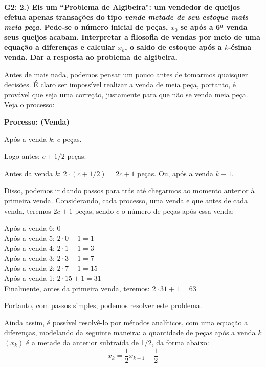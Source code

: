\documentclass[10pt]{article}
\begin{document}
\vspace{\baselineskip}


\textbf{G2: 2.) Eis um ``Problema de Algibeira": um vendedor de queijos efetua apenas transações do tipo \emph{vende metade de seu estoque mais meia peça}. Pede-se o número inicial de peças, $x_0$ se após a 6ª venda seus queijos acabam. Interpretar a filosofia de vendas por meio de uma equação a diferenças e calcular $x_k$, o saldo de estoque após a $k$-ésima venda. Dar a resposta ao problema de algibeira.}

Antes de mais nada, podemos pensar um pouco antes de tomarmos quaisquer decisões. É claro ser impossível realizar a venda de meia peça, portanto, é provável que seja uma correção, justamente para que não se venda meia peça. Veja o processo:

\textbf{Processo: (Venda)}

Após a venda $k$: $c$ peças.

Logo antes: $c + 1/2$ peças.

Antes da venda $k$: $2 \cdot (c + 1/2) = \boxed{2c + 1}$ peças. Ou, após a venda $k - 1$.

Disso, podemos ir dando passos para trás até chegarmos ao momento anterior à primeira venda. Considerando, cada processo, uma venda e que antes de cada venda, teremos $2c + 1$ peças, sendo $c$ o número de peças após essa venda:

Após a venda 6: 0\\
Após a venda 5: $2 \cdot 0 + 1 = 1$\\
Após a venda 4: $2 \cdot 1 + 1 = 3$\\
Após a venda 3: $2 \cdot 3 + 1 = 7$\\
Após a venda 2: $2 \cdot 7 + 1 = 15$\\
Após a venda 1: $2 \cdot 15 + 1 = 31$\\
Finalmente, antes da primeira venda, teremos: $2 \cdot 31 + 1 = 63$

Portanto, com passos simples, podemos resolver este problema.

Ainda assim, é possível resolvê-lo por métodos analíticos, com uma equação a diferenças, modelando da seguinte maneira: a quantidade de peças após a venda $k$ $(x_k)$ é a metade da anterior subtraída de 1/2, da forma abaixo:
\[x_k = \frac{1}{2}x_{k - 1} - \frac{1}{2}\]
\end{document}
